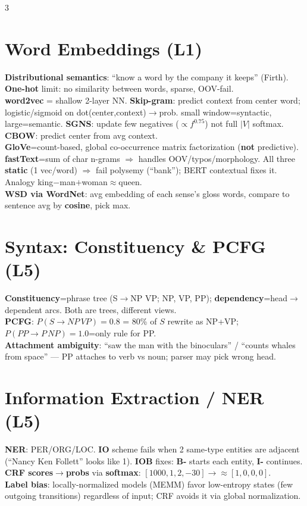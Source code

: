 \documentclass[12pt]{extarticle} %
\newcommand{\sub}[1]{\textcolor{key}{\textbf{#1}}}
\begin{document}
\begin{multicols}{3}
\section{Word Embeddings \textnormal{(L1)}}
\sub{Distributional semantics}: ``know a word by the company it keeps'' (Firth). \sub{One-hot} limit: no similarity between words, sparse, OOV-fail.\\
\sub{word2vec} = shallow 2-layer NN. \sub{Skip-gram}: predict context from center word; logistic/sigmoid on dot(center,context)$\to$prob. small window=syntactic, large=semantic. \sub{SGNS}: update few negatives ($\propto f^{0.75}$) not full $|V|$ softmax. \sub{CBOW}: predict center from avg context.\\
\sub{GloVe}=count-based, global co-occurrence matrix factorization (\sub{not} predictive). \sub{fastText}=sum of char n-grams $\Rightarrow$ handles OOV/typos/morphology. All three \sub{static} (1 vec/word) $\Rightarrow$ fail polysemy (``bank''); BERT contextual fixes it. Analogy king$-$man$+$woman$\approx$queen.\\
\sub{WSD via WordNet}: avg embedding of each sense's gloss words, compare to sentence avg by \sub{cosine}, pick max.

\section{Syntax: Constituency \& PCFG \textnormal{(L5)}}
\sub{Constituency}=phrase tree (S$\to$NP VP; NP, VP, PP); \sub{dependency}=head$\to$dependent arcs. Both are trees, different views.\\
\sub{PCFG}: $P(S\!\to\!NP\,VP){=}0.8$ = 80\% of $S$ rewrite as NP+VP; $P(PP\!\to\!P\,NP){=}1.0$=only rule for PP.\\
\sub{Attachment ambiguity}: ``saw the man with the binoculars'' / ``counts whales from space'' — PP attaches to verb vs noun; parser may pick wrong head.

\section{Information Extraction / NER \textnormal{(L5)}}
\sub{NER}: PER/ORG/LOC. \sub{IO} scheme fails when 2 same-type entities are adjacent (``Nancy Ken Follett'' looks like 1). \sub{IOB} fixes: \sub{B-} starts each entity, \sub{I-} continues.\\
\sub{CRF scores$\to$probs} via \sub{softmax}: $[1000,1,2,-30]\!\to\!\approx[1,0,0,0]$.\\
\sub{Label bias}: locally-normalized models (MEMM) favor low-entropy states (few outgoing transitions) regardless of input; CRF avoids it via global normalization.


\end{multicols}
\end{document}
